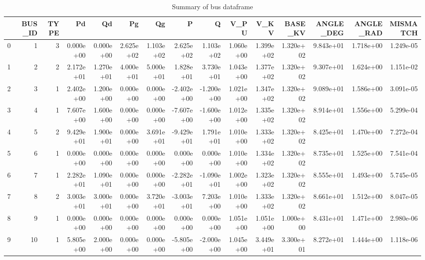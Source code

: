 \begin{table}
\centering
\caption{Summary of bus dataframe}
\label{tab:bus_dataframe}
\begin{tabular}{lrrrrrrrrrrrrrr}
\toprule
{} &  BUS\_ID &  TYPE &        Pd &        Qd &        Pg &        Qg &          P &          Q &      V\_PU &      V\_KV &   BASE\_KV &  ANGLE\_DEG &  ANGLE\_RAD &  MISMATCH \\
\midrule
0 &       1 &     3 & 0.000e+00 & 0.000e+00 & 2.625e+02 & 1.103e+02 &  2.625e+02 &  1.103e+02 & 1.060e+00 & 1.399e+02 & 1.320e+02 &  9.843e+01 &  1.718e+00 & 1.249e-05 \\
1 &       2 &     2 & 2.172e+01 & 1.270e+01 & 4.000e+01 & 5.000e+01 &  1.828e+01 &  3.730e+01 & 1.043e+00 & 1.377e+02 & 1.320e+02 &  9.307e+01 &  1.624e+00 & 1.151e-02 \\
2 &       3 &     1 & 2.402e+00 & 1.200e+00 & 0.000e+00 & 0.000e+00 & -2.402e+00 & -1.200e+00 & 1.021e+00 & 1.347e+02 & 1.320e+02 &  9.089e+01 &  1.586e+00 & 3.091e-05 \\
3 &       4 &     1 & 7.607e+00 & 1.600e+00 & 0.000e+00 & 0.000e+00 & -7.607e+00 & -1.600e+00 & 1.012e+00 & 1.335e+02 & 1.320e+02 &  8.914e+01 &  1.556e+00 & 5.299e-04 \\
4 &       5 &     2 & 9.429e+01 & 1.900e+01 & 0.000e+00 & 3.691e+01 & -9.429e+01 &  1.791e+01 & 1.010e+00 & 1.333e+02 & 1.320e+02 &  8.425e+01 &  1.470e+00 & 7.272e-04 \\
5 &       6 &     1 & 0.000e+00 & 0.000e+00 & 0.000e+00 & 0.000e+00 &  0.000e+00 &  0.000e+00 & 1.010e+00 & 1.334e+02 & 1.320e+02 &  8.735e+01 &  1.525e+00 & 7.541e-04 \\
6 &       7 &     1 & 2.282e+01 & 1.090e+01 & 0.000e+00 & 0.000e+00 & -2.282e+01 & -1.090e+01 & 1.002e+00 & 1.323e+02 & 1.320e+02 &  8.555e+01 &  1.493e+00 & 5.745e-05 \\
7 &       8 &     2 & 3.003e+01 & 3.000e+01 & 0.000e+00 & 3.720e+01 & -3.003e+01 &  7.203e+00 & 1.010e+00 & 1.333e+02 & 1.320e+02 &  8.661e+01 &  1.512e+00 & 8.047e-05 \\
8 &       9 &     1 & 0.000e+00 & 0.000e+00 & 0.000e+00 & 0.000e+00 &  0.000e+00 &  0.000e+00 & 1.051e+00 & 1.051e+00 & 1.000e+00 &  8.431e+01 &  1.471e+00 & 2.980e-06 \\
9 &      10 &     1 & 5.805e+00 & 2.000e+00 & 0.000e+00 & 0.000e+00 & -5.805e+00 & -2.000e+00 & 1.045e+00 & 3.449e+01 & 3.300e+01 &  8.272e+01 &  1.444e+00 & 1.118e-06 \\
\bottomrule
\end{tabular}
\end{table}
